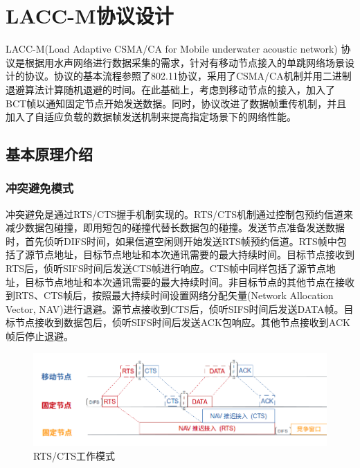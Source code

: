 \chapter{LACC-M协议设计}
LACC-M(Load Adaptive CSMA/CA for Mobile underwater acoustic network) 协议是根据用水声网络进行数据采集的需求，针对有移动节点接入的单跳网络场景设计的协议。协议的基本流程参照了802.11协议，采用了CSMA/CA机制并用二进制退避算法计算随机退避的时间。在此基础上，考虑到移动节点的接入，加入了BCT帧以通知固定节点开始发送数据。同时，协议改进了数据帧重传机制，并且加入了自适应负载的数据帧发送机制来提高指定场景下的网络性能。

\section {基本原理介绍}
\subsection{冲突避免模式}
冲突避免是通过RTS/CTS握手机制实现的。RTS/CTS机制通过控制包预约信道来减少数据包碰撞，即用短包的碰撞代替长数据包的碰撞。发送节点准备发送数据时，首先侦听DIFS时间，如果信道空闲则开始发送RTS帧预约信道。RTS帧中包括了源节点地址，目标节点地址和本次通讯需要的最大持续时间。目标节点接收到RTS后，侦听SIFS时间后发送CTS帧进行响应。CTS帧中同样包括了源节点地址，目标节点地址和本次通讯需要的最大持续时间。非目标节点的其他节点在接收到RTS、CTS帧后，按照最大持续时间设置网络分配矢量(Network Allocation Vector, NAV)进行退避。源节点接收到CTS后，侦听SIFS时间后发送DATA帧。目标节点接收到数据包后，侦听SIFS时间后发送ACK包响应。其他节点接收到ACK帧后停止退避。
\begin{figure}[ht]
	\centering
	\includegraphics[scale=0.4]{figures/rtscts.png}
	\caption{
		RTS/CTS工作模式
	}
	\label{fig:example}
\end{figure}
